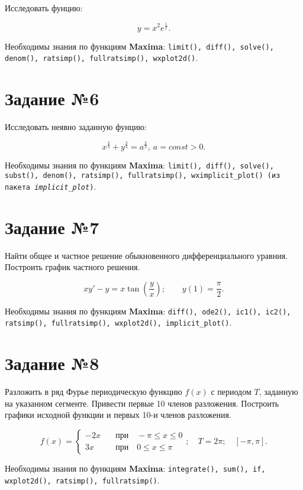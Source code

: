     Исследовать фунцию:

    \[
        y = x^2 e^{\frac{1}{x}}.
    \]
    
    Необходимы знания по функциям \textbf{Maxima}: {\tt limit(), diff(), solve(), denom(), ratsimp(), fullratsimp(), wxplot2d()}.

\section*{Задание №6}

	Исследовать неявно заданную фунцию:

	\[
		x^{\frac{2}{3}} + y^{\frac{2}{3}} = a^{\frac{2}{3}}, \: a = const > 0.
	\]

	Необходимы знания по функциям \textbf{Maxima}: {\tt limit(), diff(), solve(), subst(), denom(), ratsimp(), fullratsimp(), wximplicit\_plot() (из пакета \textit{implicit\_plot})}.

\section*{Задание №7}
    
    Найти общее и частное решение обыкновенного дифференциального уравния. Построить график частного решения.

    \[
        x y' - y = x \tan \left( \frac{y}{x} \right); \qquad y(1) = \frac{\pi}{2}.
    \]

    Необходимы знания по функциям \textbf{Maxima}: {\tt diff(), ode2(), ic1(), ic2(), ratsimp(), fullratsimp(), wxplot2d(), implicit\_plot()}.

\section*{Задание №8}
    
    Разложить в ряд Фурье периодическую функцию $f(x)$ с периодом $T$, заданную на указанном сегменте. Привести первые 10 членов разложения. Построить графики исходной функции и первых 10-и членов разложения.

    \[
        f(x) =
            \begin{cases}
                -2 x \quad &\mbox{при} \quad -\pi \leq x \leq 0\\
                3 x \quad &\mbox{при} \quad 0 \leq x \leq \pi
            \end{cases}; \quad T = 2 \pi; \quad [-\pi, \pi].
    \]
    
    Необходимы знания по функциям \textbf{Maxima}: {\tt integrate(), sum(), if, wxplot2d(), ratsimp(), fullratsimp()}.

